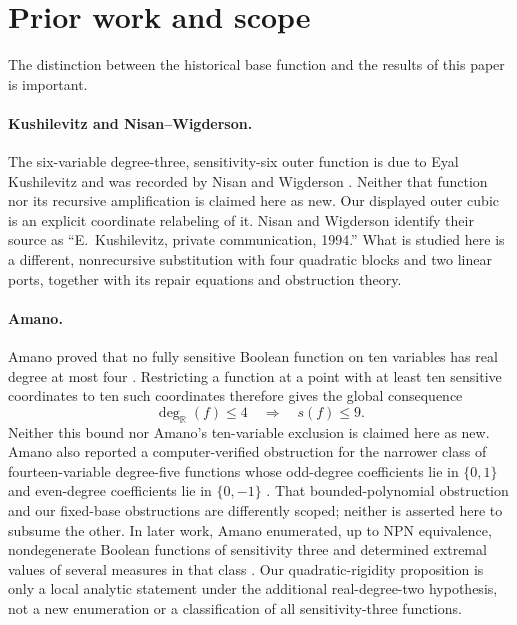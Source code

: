\documentclass[11pt]{article}
\theoremstyle{definition}
\begin{document}
\section{Prior work and scope}\label{sec:related}

The distinction between the historical base function and the results of this
paper is important.

\paragraph{Kushilevitz and Nisan--Wigderson.}
The six-variable degree-three, sensitivity-six outer function is due to Eyal
Kushilevitz and was recorded by Nisan and Wigderson
\cite{NisanWigderson1995}.  Neither that function nor its recursive
amplification is claimed here as new.  Our displayed outer cubic is an explicit
coordinate relabeling of it.  Nisan and Wigderson identify their source as
``E.~Kushilevitz, private communication, 1994.''  What is studied here is a different, nonrecursive
substitution with four quadratic blocks and two linear ports, together with its
repair equations and obstruction theory.

\paragraph{Amano.}
Amano proved that no fully sensitive Boolean function on ten variables has
real degree at most four \cite[Theorem~3]{Amano2010}.  Restricting a function
at a point with at least ten sensitive coordinates to ten such coordinates
therefore gives the global consequence
\[
 \deg_{\mathbb R}(f)\le4\quad\Longrightarrow\quad s(f)\le9.
\]
Neither this bound nor Amano's ten-variable exclusion is claimed here as new.
Amano also reported a computer-verified obstruction for the narrower class of
fourteen-variable degree-five functions whose odd-degree coefficients lie in
\(\{0,1\}\) and even-degree coefficients lie in \(\{0,-1\}\)
\cite[Fact~6]{Amano2010}.  That bounded-polynomial obstruction and our
fixed-base obstructions are differently scoped; neither is asserted here to
subsume the other.  In later work, Amano enumerated, up to NPN equivalence,
nondegenerate Boolean functions of sensitivity three and determined extremal
values of several measures in that class \cite{Amano2017}.  Our
quadratic-rigidity proposition is only a local analytic statement under the
additional real-degree-two hypothesis, not a new enumeration or a
classification of all sensitivity-three functions.
\end{document}
